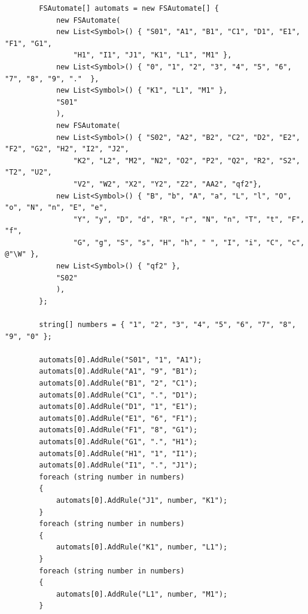 \documentclass[a4paper,10pt]{article}
\begin{document}
	\begin{lstlisting}
		FSAutomate[] automats = new FSAutomate[] {
			new FSAutomate(
			new List<Symbol>() { "S01", "A1", "B1", "C1", "D1", "E1", "F1", "G1",
				"H1", "I1", "J1", "K1", "L1", "M1" },
			new List<Symbol>() { "0", "1", "2", "3", "4", "5", "6", "7", "8", "9", "."  },
			new List<Symbol>() { "K1", "L1", "M1" },
			"S01"
			),
			new FSAutomate(
			new List<Symbol>() { "S02", "A2", "B2", "C2", "D2", "E2", "F2", "G2", "H2", "I2", "J2",
				"K2", "L2", "M2", "N2", "O2", "P2", "Q2", "R2", "S2", "T2", "U2",
				"V2", "W2", "X2", "Y2", "Z2", "AA2", "qf2"},
			new List<Symbol>() { "B", "b", "A", "a", "L", "l", "O", "o", "N", "n", "E", "e",
				"Y", "y", "D", "d", "R", "r", "N", "n", "T", "t", "F", "f",
				"G", "g", "S", "s", "H", "h", " ", "I", "i", "C", "c", @"\W" },
			new List<Symbol>() { "qf2" },
			"S02"
			),
		};
		
		string[] numbers = { "1", "2", "3", "4", "5", "6", "7", "8", "9", "0" };
		
		automats[0].AddRule("S01", "1", "A1");
		automats[0].AddRule("A1", "9", "B1");
		automats[0].AddRule("B1", "2", "C1");
		automats[0].AddRule("C1", ".", "D1");
		automats[0].AddRule("D1", "1", "E1");
		automats[0].AddRule("E1", "6", "F1");
		automats[0].AddRule("F1", "8", "G1");
		automats[0].AddRule("G1", ".", "H1");
		automats[0].AddRule("H1", "1", "I1");
		automats[0].AddRule("I1", ".", "J1");
		foreach (string number in numbers)
		{
			automats[0].AddRule("J1", number, "K1");
		}
		foreach (string number in numbers)
		{
			automats[0].AddRule("K1", number, "L1");
		}
		foreach (string number in numbers)
		{
			automats[0].AddRule("L1", number, "M1");
		}
		

\end{lstlisting}
\end{document}
